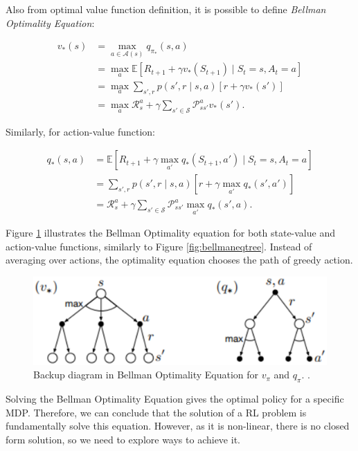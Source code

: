Also from optimal value function definition, it is possible to define \textit{Bellman Optimality Equation}:

\begin{align}
v_{*}(s) &= \max_{a \in \mathcal{A}(s)} q_{\pi_{*}}(s,a)\\
&= \max_{a} \mathbb{E}[R_{t+1} + \gamma v_{*}(S_{t+1}) \mid S_{t} = s, A_{t} = a]\\
&= \max_{a} \sum_{s', r} p(s', r \mid s, a)[r + \gamma v_{*}(s')]\\
&= \max_{a}\mathcal{R}_{s}^{a} + \gamma \sum_{s' \in \mathcal{S}} \mathcal{P}_{ss'}^{a} v_{*}(s').
\end{align}

Similarly, for action-value function:

\begin{align}
q_{*}(s,a) &= \mathbb{E}[R_{t+1} + \gamma \max_{a'} q_{*} (S_{t+1}, a') \mid S_{t} = s, A_{t} = a] \\
&= \sum_{s',r}p(s',r \mid s,a)[r + \gamma \max_{a'}q_{*}(s',a')] \\
&= \mathcal{R}_{s}^{a} + \gamma \sum_{s' \in \mathcal{S}} \mathcal{P}_{ss'}^{a} \max_{a'} q_{*}(s',a).
\end{align}

Figure \ref{fig:bellmanoptimality} illustrates the Bellman Optimality equation for both state-value and action-value functions, similarly to Figure \ref{fig:bellmaneqtree}. Instead of averaging over actions, the optimality equation chooses the path of greedy action.


\begin{figure}[!htpb]
	\centering
	\includegraphics[scale=0.5]{Cap4/bellmanoptimality.eps}
	\caption{Backup diagram in Bellman Optimality Equation for $v_{\pi}$ and $q_{\pi}$. \cite{sutton1998rli}.}
	\label{fig:bellmanoptimality}
\end{figure}

Solving the Bellman Optimality Equation gives the optimal policy for a specific MDP. Therefore, we can conclude that the solution of a RL problem is fundamentally solve this equation. However, as it is non-linear, there is no closed form solution, so we need to explore ways to achieve it.

